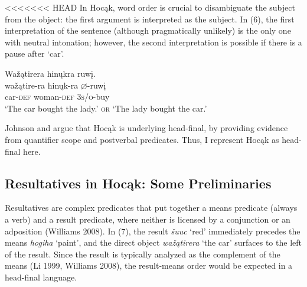\documentclass[output=paper]{LSP/langsci}
\begin{document}
<<<<<<< HEAD
In Hocąk, word order is crucial to disambiguate the subject from the object: the first argument is interpreted as the subject. In (6), the first interpretation of the sentence (although pragmatically unlikely) is the only one with neutral intonation; however, the second interpretation is  possible if there is a pause after `car'.

\begin{exe}

\ex \glll Wažątirera hinųkra ruwį.\\
wažątire-ra hinųk-ra {$\varnothing$}-ruwį\\
car-\textsc{def} woman-\textsc{def} \textsc{3s/o}-buy\\
\glt `The car bought the lady.' \textsc{or} `The lady bought the car.'

\end{exe}

Johnson and \citet{Rosen2014} argue that Hocąk is underlying head-final, by providing evidence from quantifier scope and postverbal predicates. Thus, I represent Hocąk as head-final here.

\subsection{Resultatives in Hocąk: Some Preliminaries}

Resultatives are complex predicates that put together a means predicate (always a verb) and a result predicate, where neither is licensed by a conjunction or an adposition (Williams 2008). In (7), the result \textit{šuuc} `red' immediately precedes the means \textit{hogiha} `paint', and the direct object \textit{wažątirera} `the car' surfaces to the left of the result. Since the result is typically analyzed as the complement of the means (Li 1999, Williams 2008), the result-means order would be expected in a head-final language.
\end{document}
